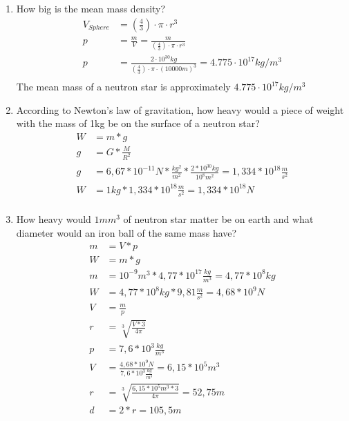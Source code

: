 \documentclass[10pt,ngerman]{scrartcl}
\begin{document}
\begin{enumerate}
	\item How big is the mean mass density?
	\begin{align*}
		V_{Sphere} &= (\frac{4}{3}) \cdot \pi \cdot r^3\\
		p &= \frac{m}{V} = \frac{m}{(\frac{4}{3}) \cdot \pi \cdot r^3}\\
		p &= \frac{2 \cdot 10^{30}kg}{(\frac{4}{3}) \cdot \pi \cdot (10000m)^3} = 4.775 \cdot 10^{17} kg/m^3 \\
	\end{align*}
	The mean mass of a neutron star is approximately $4.775 \cdot 10^{17} kg/m^3$ \newline
	
	\item According to Newton's law of gravitation, how heavy would a piece of weight with the mass of 1kg be on the surface of a neutron star?
	\begin{align*}
		W &= m * g \\
		g &= G * \frac{M}{R^{2}} \\
		g &= 6,67 * 10^{-11} N * \frac{kg^{2}}{m^{2}} * \frac{2*10^{30} kg}{10^{8} m^{2}} = 1,334 * 10^{18} \frac{m}{s^{2}} \\
		W &= 1kg * 1,334 * 10^{18} \frac{m}{s^{2}} = 1,334 * 10^{18} N \\
	\end{align*}
	\newpage
	\item How heavy would $1mm^3$ of neutron star matter be on earth and what diameter would an iron ball of the same mass have?
	\begin{align*}
		m &= V * p \\
		W &= m * g \\
		m &= 10^{-9} m^{3} * 4,77 * 10^{17} \frac{kg}{m^{3}} = 4,77 * 10^{8} kg \\
		W &= 4,77 * 10^{8} kg * 9,81 \frac{m}{s^{2}} = 4,68 * 10^{9} N \\
		V &= \frac{m}{p} \\
		r &= \sqrt[3]{\frac{V * 3}{4\pi}} \\
		p &= 7,6 * 10^{3} \frac{kg}{m^{3}} \\
		V &= \frac{4,68 * 10^{9} N}{7,6 * 10^{3} \frac{kg}{m^{3}}} = 6,15 * 10^{5} m^{3} \\
		r &= \sqrt[3]{\frac{6,15 * 10^{5} m^{3} * 3}{4\pi}} = 52,75 m \\
		d &= 2 * r = 105,5 m \\
	\end{align*}
\end{enumerate}
\end{document}
